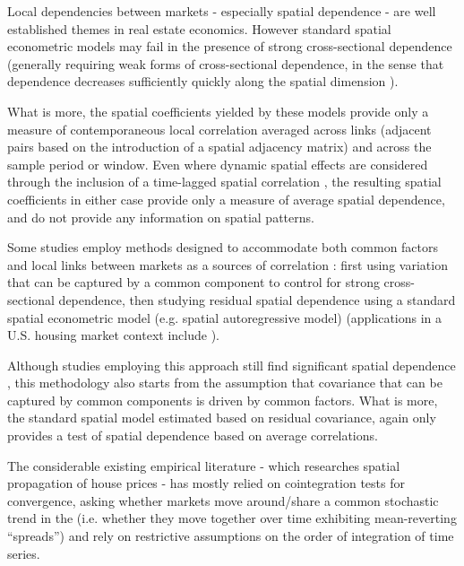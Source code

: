 \documentclass[11pt]{article}
\begin{document}
Local dependencies between markets - especially spatial dependence - are well established themes in real estate economics. However standard spatial econometric models may fail in the presence of strong cross-sectional dependence (generally requiring weak forms of cross-sectional dependence, in the sense that dependence decreases sufficiently quickly along the spatial dimension \citep{Pesaran2011}). 

What is more, the spatial coefficients yielded by these models provide only a measure of contemporaneous local correlation averaged across links (adjacent pairs based on the introduction of a spatial adjacency matrix) and across the sample period or window. Even where dynamic spatial effects are considered through the inclusion of a time-lagged spatial correlation \citep{Chudik2011,Baltagi2014}, the resulting spatial coefficients in either case provide only a measure of average spatial dependence, and do not provide any information on spatial patterns.

Some studies employ methods designed to accommodate both common factors and local links between markets as a sources of correlation \citep{Pesaran2006,Pesaran2011}: first using variation that can be captured by a common component to control for strong cross-sectional dependence, then studying residual spatial dependence %
using a standard spatial econometric model (e.g. spatial autoregressive model) (applications in a U.S. housing market context include \cite{Holly2010,Baltagi2014}). 

Although studies employing this approach still find significant spatial dependence \citep{Holly2010,Baltagi2014}, this methodology also starts from the assumption that covariance that can be captured by common components is driven by common factors. What is more, the standard spatial model estimated based on residual covariance, again only provides a test of spatial dependence based on average correlations. %

The considerable existing empirical  literature - which researches spatial propagation of house prices - has mostly relied on cointegration tests for convergence,  asking whether markets move around/share a common stochastic trend in the  (i.e. whether they move together over time exhibiting mean-reverting “spreads”) and rely on restrictive assumptions on the order of integration of time series. 
\end{document}
